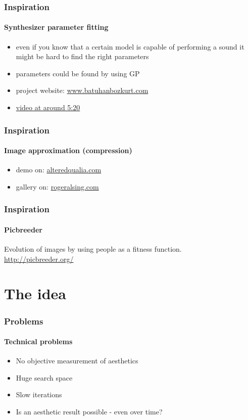 \documentclass{beamer}
\begin{document}
\begin{frame}
	\frametitle{Inspiration}
	\framesubtitle{Synthesizer parameter fitting}

	\begin{itemize}
		\item<1-> even if you know that a certain model is capable of performing a sound
		it might be hard to find the right parameters
		\item<2-> parameters could be found by using GP
		\item<3-> project website: \href{http://www.batuhanbozkurt.com/news/naturetoolkit-update-genetic-algorithms-and-parameter-estimation-for-supercollider}{www.batuhanbozkurt.com}
		\item<4-> \href{http://vimeo.com/7908757}{video at around 5:20}
	\end{itemize}
\end{frame}

\begin{frame}
	\frametitle{Inspiration}
	\framesubtitle{Image approximation (compression)}
	
	\begin{itemize}
		\item<1-> demo on: \href{http://alteredqualia.com/visualization/evolve/}{alteredqualia.com}
		\item<2-> gallery on: \href{http://rogeralsing.com/2008/12/11/genetic-gallery/}{rogeralsing.com}
	\end{itemize}
\end{frame}

\begin{frame}
	\frametitle{Inspiration}
	\framesubtitle{Picbreeder}
	
	Evolution of images by using people as a fitness function.
	\\
	\href{http://picbreeder.org/}{http://picbreeder.org/} 
\end{frame}




\section{The idea} %
\label{sg:sec:the_idea}

\begin{frame}
	\frametitle{Problems}
	\framesubtitle{Technical problems}
	
	\begin{itemize}
		\item<1-> No objective measurement of aesthetics
		\item<2-> Huge search space
		\item<3-> Slow iterations
		\item<4-> Is an aesthetic result possible - even over time?
	\end{itemize}
	
\end{frame}
\end{document}
